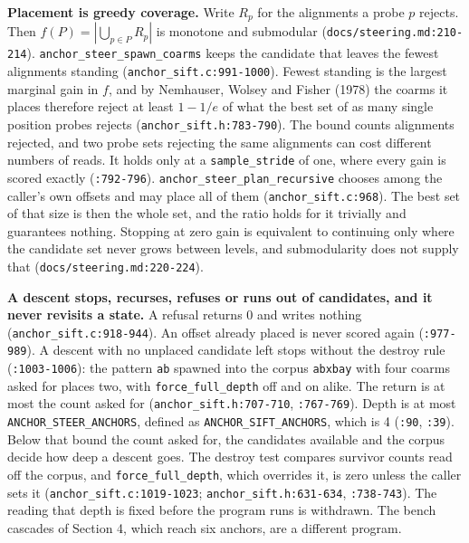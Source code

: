 \noindent\textbf{Placement is greedy coverage.} Write \(R_p\) for the alignments a probe \(p\) rejects. Then \(f(P) = |\bigcup_{p \in P} R_p|\) is monotone and submodular (\texttt{docs/\allowbreak{}steering.md:210-\allowbreak{}214}). \texttt{anchor\_\allowbreak{}steer\_\allowbreak{}spawn\_\allowbreak{}coarms} keeps the candidate that leaves the fewest alignments standing (\texttt{anchor\_sift.c:991-1000}). Fewest standing is the largest marginal gain in \(f\), and by Nemhauser, Wolsey and Fisher (1978) the coarms it places therefore reject at least \(1 - 1/e\) of what the best set of as many single position probes rejects (\texttt{anchor\_sift.h:783-790}). The bound counts alignments rejected, and two probe sets rejecting the same alignments can cost different numbers of reads. It holds only at a \texttt{sample\_stride} of one, where every gain is scored exactly (\texttt{:792-796}). \texttt{anchor\_steer\_plan\_recursive} chooses among the caller's own offsets and may place all of them (\texttt{anchor\_sift.c:968}). The best set of that size is then the whole set, and the ratio holds for it trivially and guarantees nothing. Stopping at zero gain is equivalent to continuing only where the candidate set never grows between levels, and submodularity does not supply that (\texttt{docs/\allowbreak{}steering.md:220-\allowbreak{}224}).

\noindent\textbf{A descent stops, recurses, refuses or runs out of candidates, and it never revisits a state.} A refusal returns 0 and writes nothing (\texttt{anchor\_sift.c:918-944}). An offset already placed is never scored again (\texttt{:977-989}). A descent with no unplaced candidate left stops without the destroy rule (\texttt{:1003-1006}): the pattern \texttt{ab} spawned into the corpus \texttt{abxbay} with four coarms asked for places two, with \texttt{force\_full\_depth} off and on alike. The return is at most the count asked for (\texttt{anchor\_sift.h:707-710}, \texttt{:767-769}). Depth is at most \texttt{ANCHOR\_STEER\_ANCHORS}, defined as \texttt{ANCHOR\_SIFT\_ANCHORS}, which is 4 (\texttt{:90}, \texttt{:39}). Below that bound the count asked for, the candidates available and the corpus decide how deep a descent goes. The destroy test compares survivor counts read off the corpus, and \texttt{force\_full\_depth}, which overrides it, is zero unless the caller sets it (\texttt{anchor\_sift.c:1019-1023}; \texttt{anchor\_sift.h:631-634}, \texttt{:738-743}). The reading that depth is fixed before the program runs is withdrawn. The bench cascades of Section 4, which reach six anchors, are a different program.

